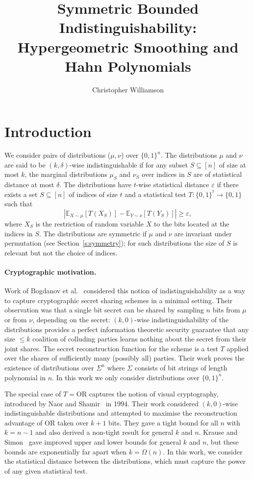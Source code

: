 \documentclass[manuscript,nonacm]{acmart}
\title[Symmetric Bounded Indistinguishability]{Symmetric Bounded Indistinguishability: Hypergeometric Smoothing and Hahn Polynomials}
\author{Christopher Williamson}
\affiliation{
  \institution{Independent researcher}
  \city{Hong Kong}
  \country{Hong Kong, China}
}
\begin{document}
\maketitle

\section{Introduction}
We consider pairs of distributions ($\mu,\nu$) over $\{0,1\}^n$.
The distributions $\mu$ and $\nu$ are said to be $(k,\delta)$-wise
indistinguishable if for any subset $S \subseteq [n]$ of size at most $k$,
the marginal distributions $\mu_S$ and $\nu_S$ over indices in $S$ are
of statistical distance at most $\delta$. The distributions have $t$-wise statistical distance $\varepsilon$ if there exists a set $S \subseteq [n]$ of indices of size $t$ and a
statistical test $T:\{0,1\}^{t} \to \{0,1\}$ such that
\[
\left|
\mathbb E_{X \sim \mu}[T(X_S)]
-
\mathbb E_{Y \sim \nu}[T(Y_S)]
\right|
\geq \varepsilon,
\]
where $X_S$ is the restriction of random variable $X$ to the bits located
at the indices in $S$. The distributions are symmetric if $\mu$ and
$\nu$ are invariant under permutation (see Section~\ref{s:symmetry}); for
such distributions the size of $S$ is relevant but not
the choice of indices.

\paragraph{Cryptographic motivation.}

Work of Bogdanov et al.~\cite{bogdanov2016bounded, bogdanov2017approximate} considered this notion of
indistinguishability as a way to capture cryptographic secret sharing
schemes in a minimal setting. Their observation was that a single bit secret
can be shared by sampling $n$ bits from $\mu$ or from $\nu$, depending on
the secret: $(k,0)$-wise indistinguishability of the distributions provides
a perfect information theoretic security guarantee that any size $\leq k$ coalition of colluding parties
learns nothing about the secret from their joint shares. The secret
reconstruction function for the scheme is a test $T$ applied over the shares
of sufficiently many (possibly all) parties. Their work proves the existence of distributions over $\Sigma^n$ where $\Sigma$ consists of bit strings of length polynomial in $n$. In this work we only consider distributions over $\{0,1\}^n$.

The special case of $T=\mathrm{OR}$ captures the notion of visual
cryptography, introduced by Naor and Shamir~\cite{naor1994visual} in 1994. Their work
considered $(k,0)$-wise indistinguishable distributions and attempted to
maximise the reconstruction advantage of $\mathrm{OR}$ taken over $k+1$
bits. They gave a tight bound for all $n$ with $k=n-1$ and also derived a non-tight result for general $k$ and $n$. Krause and
Simon~\cite{krause2003determining} gave improved upper and lower bounds for general $k$ and $n$, but these bounds are exponentially far apart when $k=\Omega(n)$. In
this work, we consider the statistical distance between the distributions, which must capture the power of any given statistical test. 
\end{document}
